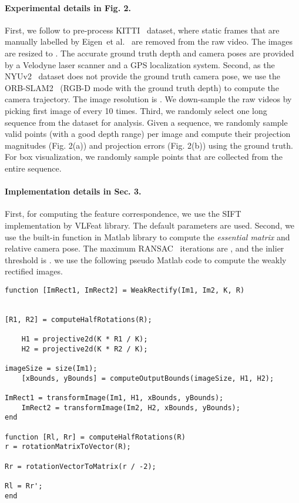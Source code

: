 \documentclass{article}
\def\etal{et al.}
\begin{document}
\paragraph{Experimental details in Fig. 2.}
First, we follow \cite{zhou2017unsupervised,bian2019depth} to pre-process KITTI~\cite{Geiger2013IJRR} dataset,
where static frames that are manually labelled by Eigen~\etal~\cite{eigen2014depth} are removed from the raw video.
The images are resized to .
The accurate ground truth depth and camera poses are provided by a Velodyne laser scanner and a GPS localization system. 
Second, as the NYUv2~\cite{silberman2012indoor} dataset does not provide the ground truth camera pose, we use the ORB-SLAM2~\cite{mur2015orb} (RGB-D mode with the ground truth depth) to compute the camera trajectory.
The image resolution is .
We down-sample the raw videos by picking first image of every 10 times.
Third, we randomly select one long sequence from the dataset for analysis.
Given a sequence, we randomly sample  valid points (with a good depth range) per image and compute their projection magnitudes (Fig. 2(a)) and projection errors (Fig. 2(b)) using the ground truth.
For box visualization, we randomly sample  points that are collected from the entire sequence.


\paragraph{Implementation details in Sec. 3.}
First, for computing the feature correspondence,
we use the SIFT~\cite{lowe2004distinctive} implementation by VLFeat library.
The default parameters are used.
Second, we use the built-in function in Matlab library to compute the \emph{essential matrix} and relative camera pose.
The maximum RANSAC~\cite{fischler1981random} iterations are ,
and the inlier threshold is .
we use the following pseudo Matlab code to compute the weakly rectified images.

\begin{verbatim}
function [ImRect1, ImRect2] = WeakRectify(Im1, Im2, K, R)


[R1, R2] = computeHalfRotations(R);
    
    H1 = projective2d(K * R1 / K);
    H2 = projective2d(K * R2 / K);

imageSize = size(Im1);
    [xBounds, yBounds] = computeOutputBounds(imageSize, H1, H2);

ImRect1 = transformImage(Im1, H1, xBounds, yBounds);
    ImRect2 = transformImage(Im2, H2, xBounds, yBounds);
end

function [Rl, Rr] = computeHalfRotations(R)
r = rotationMatrixToVector(R);
    
Rr = rotationVectorToMatrix(r / -2);
    
Rl = Rr';
end
\end{verbatim}
\end{document}
